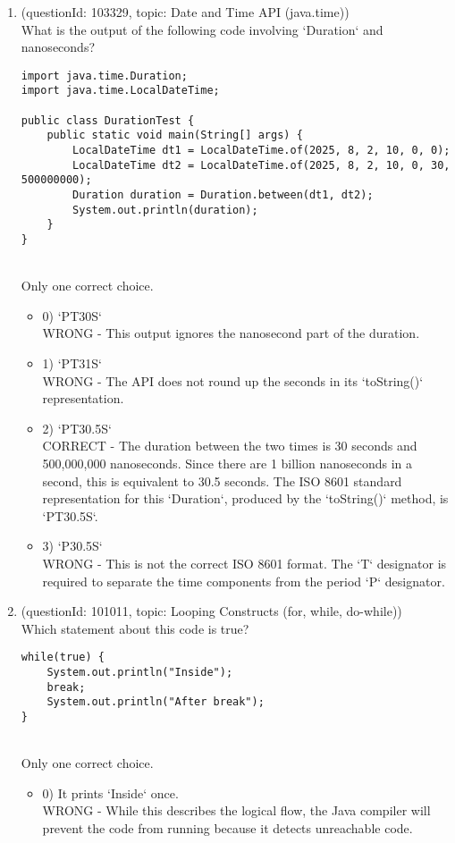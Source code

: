 \documentclass[12pt]{article}
\begin{document}
\begin{enumerate}[label=(\arabic*)]
\begin{itemize}
\end{itemize}
\item (questionId: 103329, topic: Date and Time API (java.time)) \\ 
What is the output of the following code involving `Duration` and nanoseconds?
\begin{verbatim}
import java.time.Duration;
import java.time.LocalDateTime;

public class DurationTest {
    public static void main(String[] args) {
        LocalDateTime dt1 = LocalDateTime.of(2025, 8, 2, 10, 0, 0);
        LocalDateTime dt2 = LocalDateTime.of(2025, 8, 2, 10, 0, 30, 500000000);
        Duration duration = Duration.between(dt1, dt2);
        System.out.println(duration);
    }
}
\end{verbatim}
\\ \noindent Only one correct choice. 
\begin{itemize}
\item 0) `PT30S`
 \\ 
WRONG - This output ignores the nanosecond part of the duration.

\item 1) `PT31S`
 \\ 
WRONG - The API does not round up the seconds in its `toString()` representation.

\item 2) `PT30.5S`
 \\ 
CORRECT - The duration between the two times is 30 seconds and 500,000,000 nanoseconds. Since there are 1 billion nanoseconds in a second, this is equivalent to 30.5 seconds. The ISO 8601 standard representation for this `Duration`, produced by the `toString()` method, is `PT30.5S`.

\item 3) `P30.5S`
 \\ 
WRONG - This is not the correct ISO 8601 format. The `T` designator is required to separate the time components from the period `P` designator.

\end{itemize}
\item (questionId: 101011, topic: Looping Constructs (for, while, do-while)) \\ 
Which statement about this code is true?\n\begin{verbatim}
while(true) {
    System.out.println("Inside");
    break;
    System.out.println("After break");
}
\end{verbatim}
\\ \noindent Only one correct choice. 
\begin{itemize}
\item 0) It prints `Inside` once.
 \\ 
WRONG - While this describes the logical flow, the Java compiler will prevent the code from running because it detects unreachable code.


\end{itemize}
\end{enumerate}
\end{document}
